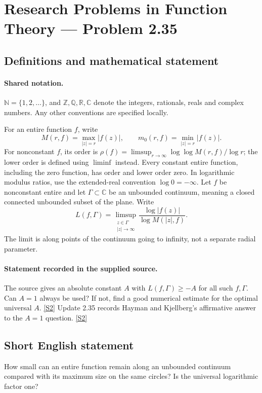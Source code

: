 \documentclass[11pt]{article}
\newcommand{\sref}[2]{\hyperlink{source:#1:#2}{[S#2]}}
\begin{document}
\section{Research Problems in Function Theory — Problem 2.35}\label{statement}

\subsection{Definitions and mathematical statement}

\paragraph{Shared notation.}$\mathbb N=\{1,2,\ldots\}$, and $\mathbb Z,\mathbb Q,\mathbb R,\mathbb C$ denote the integers, rationals, reals and complex numbers. Any other conventions are specified locally.


For an entire function $f$, write
\[
 M(r,f)=\max_{|z|=r}|f(z)|,\qquad m_0(r,f)=\min_{|z|=r}|f(z)|.
\]
For nonconstant $f$, its order is $\rho(f)=\limsup_{r\to\infty}\log\log M(r,f)/\log r$;
the lower order is defined using $\liminf$ instead. Every constant entire function, including the zero function, has order and lower order zero. In logarithmic modulus ratios, use the extended-real convention $\log0=-\infty$.
Let $f$ be nonconstant entire and let $\Gamma\subset\mathbb C$ be an unbounded continuum, meaning a closed connected unbounded subset of the plane. Write
\[L(f,\Gamma)=\limsup_{\substack{z\in\Gamma\\|z|\to\infty}}
\frac{\log|f(z)|}{\log M(|z|,f)}.\]
The limit is along points of the continuum going to infinity, not a separate radial parameter.

\paragraph{Statement recorded in the supplied source.}
The source gives an absolute constant $A$ with $L(f,\Gamma)\ge -A$ for all such $f,\Gamma$. Can $A=1$ always be used? If not, find a good numerical estimate for the optimal universal $A$. \sref{statement}{2}
Update 2.35 records Hayman and Kjellberg's affirmative answer to the $A=1$ question. \sref{statement}{2}
\subsection{Short English statement}
How small can an entire function remain along an unbounded continuum compared with its maximum size on the same circles? Is the universal logarithmic factor one?
\end{document}
